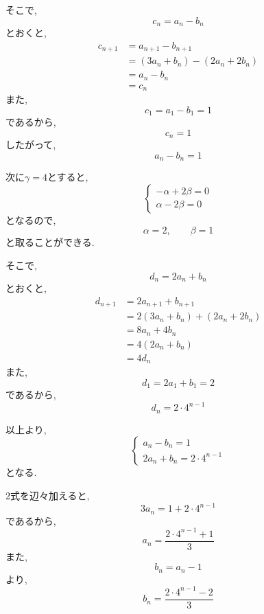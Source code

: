 \begin{enumerate}[label=(\arabic*),parsep=3pt,format=\bookitemlink{example-system-1}{solution}{problem}]
          そこで,
          \[
            c_n=a_n-b_n
          \]
          とおくと,
          \begin{align*}
            c_{n+1}
              &=a_{n+1}-b_{n+1}\\
              &=(3a_n+b_n)-(2a_n+2b_n)\\
              &=a_n-b_n\\
              &=c_n
          \end{align*}
          また,
          \[
            c_1=a_1-b_1=1
          \]
          であるから,
          \[
            c_n=1
          \]
          したがって,
          \[
            a_n-b_n=1
          \]

          次に$\gamma=4$とすると,
          \[
          \begin{cases}
            -\alpha+2\beta=0\\
            \alpha-2\beta=0
          \end{cases}
          \]
          となるので,
          \[
            \alpha=2,\qquad\beta=1
          \]
          と取ることができる.

          そこで,
          \[
            d_n=2a_n+b_n
          \]
          とおくと,
          \begin{align*}
            d_{n+1}
              &=2a_{n+1}+b_{n+1}\\
              &=2(3a_n+b_n)+(2a_n+2b_n)\\
              &=8a_n+4b_n\\
              &=4(2a_n+b_n)\\
              &=4d_n
          \end{align*}
          また,
          \[
            d_1=2a_1+b_1=2
          \]
          であるから,
          \[
            d_n=2\cdot4^{n-1}
          \]

          以上より,
          \[
          \begin{cases}
            a_n-b_n=1\\
            2a_n+b_n=2\cdot4^{n-1}
          \end{cases}
          \]
          となる.

          2式を辺々加えると,
          \[
            3a_n=1+2\cdot4^{n-1}
          \]
          であるから,
          \[
            a_n=\frac{2\cdot4^{n-1}+1}{3}
          \]
          また,
          \[
            b_n=a_n-1
          \]
          より,
          \[
            b_n=\frac{2\cdot4^{n-1}-2}{3}
          \]
    \end{enumerate}

